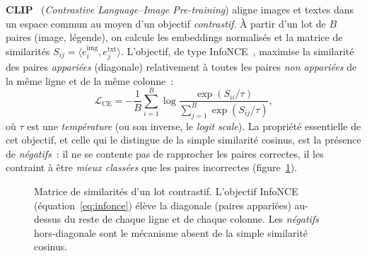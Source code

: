 \documentclass[12pt,a4paper,oneside]{report}
\theoremstyle{definition}
\theoremstyle{plain}
\begin{document}
\textbf{CLIP}~\cite{radford2021clip} (\emph{Contrastive Language--Image
Pre-training}) aligne images et textes dans un espace commun au moyen d'un
objectif \emph{contrastif}. À partir d'un lot de $B$ paires (image, légende), on
calcule les embeddings normalisés et la matrice de similarités
$S_{ij} = \langle e^{\text{img}}_i, e^{\text{txt}}_j\rangle$. L'objectif, de type
InfoNCE~\cite{oord2018infonce}, maximise la similarité des paires \emph{appariées}
(diagonale) relativement à toutes les paires \emph{non appariées} de la même
ligne et de la même colonne~:
\begin{equation}
\mathcal{L}_{\text{CE}} = -\frac{1}{B}\sum_{i=1}^{B}
\log\frac{\exp(S_{ii}/\tau)}{\sum_{j=1}^{B}\exp(S_{ij}/\tau)} ,
\label{eq:infonce}
\end{equation}
où $\tau$ est une \emph{température} (ou son inverse, le \emph{logit scale}). La
propriété essentielle de cet objectif, et celle qui le distingue de la simple
similarité cosinus, est la présence de \emph{négatifs}~: il ne se contente pas de
rapprocher les paires correctes, il les contraint à être \emph{mieux classées}
que les paires incorrectes (figure~\ref{fig:contrastif}).

\begin{figure}[ht]
\centering
{}
\caption{Matrice de similarités d'un lot contrastif. L'objectif InfoNCE
(équation~\eqref{eq:infonce}) élève la diagonale (paires appariées) au-dessus du
reste de chaque ligne et de chaque colonne. Les \emph{négatifs} hors-diagonale
sont le mécanisme absent de la simple similarité cosinus.}
\label{fig:contrastif}
\end{figure}
\end{document}
